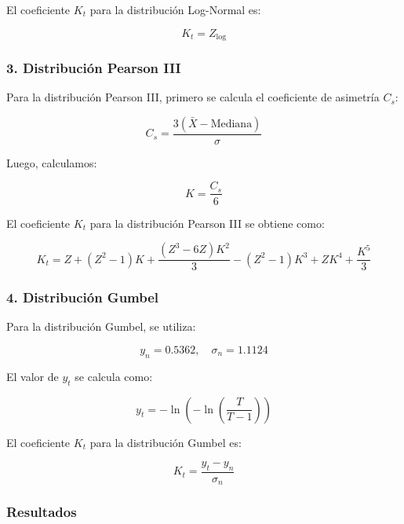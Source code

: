 \documentclass{article}  %
\begin{document}
El coeficiente \( K_t \) para la distribución Log-Normal es:

\begin{equation}
K_t = Z_{\text{log}}
\end{equation}

\subsubsection*{3. Distribución Pearson III}
Para la distribución Pearson III, primero se calcula el coeficiente de asimetría \( C_s \):

\begin{equation}
C_s = \frac{3(\bar{X} - \text{Mediana})}{\sigma}
\end{equation}

Luego, calculamos:

\begin{equation}
K = \frac{C_s}{6}
\end{equation}

El coeficiente \( K_t \) para la distribución Pearson III se obtiene como:

\begin{equation}
K_t = Z + (Z^2 - 1)K + \frac{(Z^3 - 6Z)K^2}{3} - (Z^2 - 1)K^3 + ZK^4 + \frac{K^5}{3}
\end{equation}

\subsubsection*{4. Distribución Gumbel}
Para la distribución Gumbel, se utiliza:

\begin{equation}
y_n = 0.5362, \quad \sigma_n = 1.1124
\end{equation}

El valor de \( y_t \) se calcula como:

\begin{equation}
y_t = -\ln\left(-\ln\left(\frac{T}{T - 1}\right)\right)
\end{equation}

El coeficiente \( K_t \) para la distribución Gumbel es:

\begin{equation}
K_t = \frac{y_t - y_n}{\sigma_n}
\end{equation}

\subsubsection{Resultados}
\end{document}

